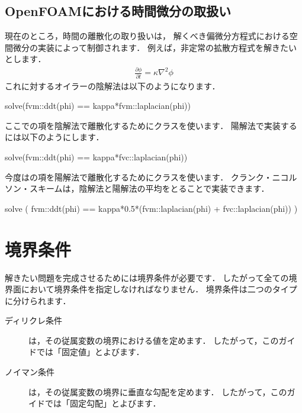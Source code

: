 \subsection{OpenFOAMにおける時間微分の取扱い}
\label{ssec:2.5.1}
現在のところ，時間の離散化の取り扱いは，
解くべき偏微分方程式における空間微分の実装によって制御されます．
例えば，非定常の拡散方程式を解きたいとします．
\begin{align}
 \label{eq:2.37}
 \frac{\partial\phi}{\partial t} = \kappa\nabla^{2}\phi
\end{align}
これに対するオイラーの陰解法は以下のようになります．
\begin{OFverbatim}[file]
solve(fvm::ddt(phi) == kappa*fvm::laplacian(phi))
\end{OFverbatim}
ここでの項を陰解法で離散化するためにクラスを使います．
陽解法で実装するには以下のようにします．
\begin{OFverbatim}[file]
solve(fvm::ddt(phi) == kappa*fvc::laplacian(phi))
\end{OFverbatim}
今度はの項を陽解法で離散化するためにクラスを使います．
クランク・ニコルソン・スキームは，陰解法と陽解法の平均をとることで実装できます．
\begin{OFverbatim}[file]
solve
    (
    fvm::ddt(phi)
    ==
    kappa*0.5*(fvm::laplacian(phi) + fvc::laplacian(phi))
    )
\end{OFverbatim}



\section{境界条件}
\label{sec:2.6}
解きたい問題を完成させるためには境界条件が必要です．
したがって全ての境界面において境界条件を指定しなければなりません．
境界条件は二つのタイプに分けられます．
\begin{description}
 \item[ディリクレ条件] は，その従属変数の境界における値を定めます．
            したがって，このガイドでは「固定値」とよびます．
 \item[ノイマン条件] は，その従属変数の境界に垂直な勾配を定めます．
            したがって，このガイドでは「固定勾配」とよびます．
\end{description}

